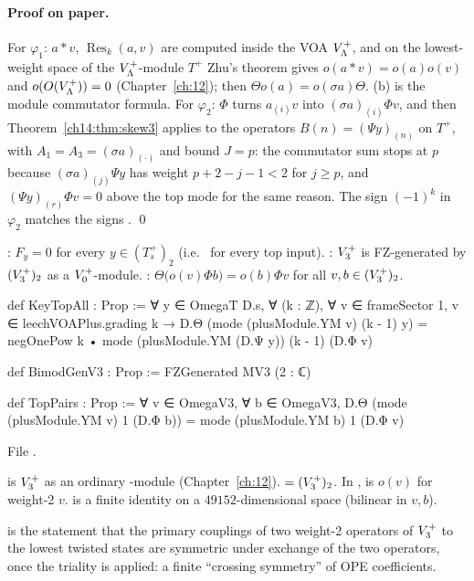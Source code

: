 \paragraph{Proof on paper.}  For $\varphi_1$: $a*v$, $\operatorname{Res}_k(a,v)$ are computed inside the VOA
$V_{\Lambda}^+$, and on the lowest-weight space of the $V_{\Lambda}^+$-module $T^+$ Zhu's theorem gives
$o(a*v)=o(a)o(v)$ and $o(O(V_{\Lambda}^+))=0$ (Chapter~\ref{ch:12}); then $\Theta o(a)=o(\sigma a)\Theta$.
(b) is the module commutator formula.  For $\varphi_2$: $\Phi$ turns $a_{(i)}v$ into $(\sigma a)_{(i)}\Phi v$, and
then Theorem~\ref{ch14:thm:skew3} applies to the operators $B(n)=(\Psi y)_{(n)}$ on $T^+$, with
$A_1=A_3=(\sigma a)_{(\cdot)}$ and bound $J=p$: the commutator sum stops at $p$ because
$(\sigma a)_{(j)}\Psi y$ has weight $p+2-j-1<2$ for $j\ge p$, and $(\Psi y)_{(r)}\Phi v=0$ above the top mode
for the same reason.  The sign $(-1)^k$ in $\varphi_2$ matches the signs . \qed

\begin{definition}\label{ch14:def:toppairs}
: $F_y=0$ for every $y\in(T_s^+)_2$ (i.e.\  for every top input).
: $V_3^{+}$ is FZ-generated by $(V_3^{+})_2$ as a $V_0^{+}$-module.
: $\Theta\bigl(o(v)\Phi b\bigr)=o(b)\Phi v$ for all $v,b\in(V_3^{+})_2$.
\end{definition}
\begin{leancode}
def KeyTopAll : Prop :=
  ∀ y ∈ OmegaT D.s, ∀ (k : ℤ), ∀ v ∈ frameSector 1, v ∈ leechVOAPlus.grading k →
    D.Θ (mode (plusModule.YM v) (k - 1) y)
      = negOnePow k • mode (plusModule.YM (D.Ψ y)) (k - 1) (D.Φ v)

def BimodGenV3 : Prop := FZGenerated MV3 (2 : ℂ)

def TopPairs : Prop :=
  ∀ v ∈ OmegaV3, ∀ b ∈ OmegaV3,
    D.Θ (mode (plusModule.YM v) 1 (D.Φ b)) = mode (plusModule.YM b) 1 (D.Φ v)
\end{leancode}
File .

\begin{dictionary}
 is $V_3^{+}$ as an ordinary -module (Chapter~\ref{ch:12}).   $=(V_3^{+})_2$.
In ,  is $o(v)$ for weight-2 $v$.   is a finite
identity on a $49152$-dimensional space (bilinear in $v,b$).
\end{dictionary}

\begin{physics}
 is the statement that the primary couplings of two weight-2 operators of $V_3^{+}$ to
the lowest twisted states are symmetric under exchange of the two operators, once the triality is
applied: a finite ``crossing symmetry'' of OPE coefficients.
\end{physics}

